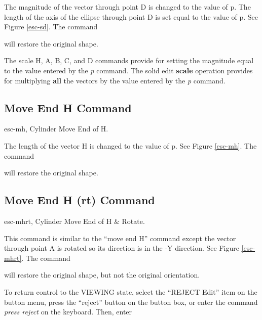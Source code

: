 The magnitude of the vector through point D is changed to the value of p.
The length of the axis of the ellipse through point D is set equal to the
value of p.  See Figure \ref{esc-sd}.  The command


will restore the original shape.

The scale H, A, B, C, and D commands provide for setting the magnitude
equal to the value entered by the {\em p} command.
The solid edit {\bf scale} operation provides
for multiplying {\bf all} the vectors by the value
entered by the {\em p} command.

\subsection{Move End H Command}
\mfig esc-mh, Cylinder Move End of H.


The length of the vector H is changed to the value of p.
See Figure \ref{esc-mh}.  The command


will restore the original shape.

\subsection{Move End H (rt) Command}
\mfig esc-mhrt, Cylinder Move End of H \& Rotate.


This command is similar to the ``move end H'' command except the vector
through point A is rotated so its direction is in the -Y direction.
See Figure \ref{esc-mhrt}.  The command


will restore the original shape, but not the original orientation.

To return control to the VIEWING state, select the ``REJECT Edit''
item on the button menu, press the ``reject'' button on the button box,
or enter the command {\em press reject} on the keyboard.
Then, enter

